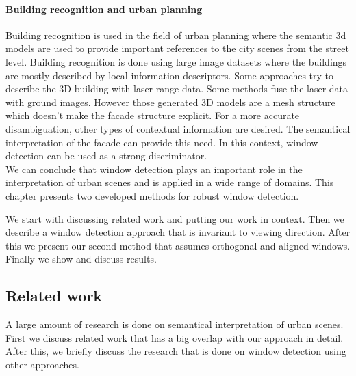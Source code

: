 \paragraph{Building recognition and urban planning}
	Building recognition is used in the field of urban planning where the semantic 3d
	models are used to provide important references to the city scenes from the
	street level.
	Building recognition is done using large image datasets where the
	buildings are mostly described by local information descriptors.  
	Some approaches try to describe the 3D building with laser range data. Some methods fuse the laser data with
	ground images. However those generated 3D models are a mesh structure which doesn't make the facade structure explicit.
	For a more accurate disambiguation, other types of contextual information are
	desired.  The semantical interpretation of the facade can provide this need.
	In this context, window detection can be used as a strong discriminator.\\



We can conclude that window detection plays an important role in the
interpretation of urban scenes and is applied in a wide range of domains.  This
chapter presents two developed methods for robust window detection.

We start with discussing related work and putting our work in context.  Then we
describe a window detection approach that is invariant to viewing direction.
After this we present our second method that assumes orthogonal and aligned
windows.  Finally we show and discuss results. 


\subsection{Related work}
A large amount of research is done on semantical interpretation of urban scenes. First we
discuss related work that has a big overlap with our approach in detail.
After this, we briefly discuss the research that is done on window detection
using other approaches.


